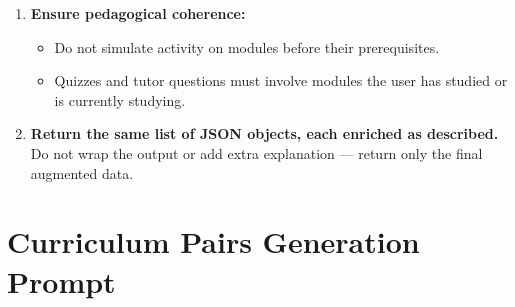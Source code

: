 \begin{tcolorbox}[colback=gray!5!white, colframe=black!60!black, title=Prompt: Data Augmentation]
{\begin{enumerate}
  \item \textbf{Ensure pedagogical coherence:}
  \begin{itemize}
    \item Do not simulate activity on modules before their prerequisites.
    \item Quizzes and tutor questions must involve modules the user has studied or is currently studying.
  \end{itemize}

  \item \textbf{Return the same list of JSON objects, each enriched as described.} Do not wrap the output or add extra explanation — return only the final augmented data.
\end{enumerate}
}
\end{tcolorbox}

\section{Curriculum Pairs Generation Prompt}
\label{appendix:prompt3}

